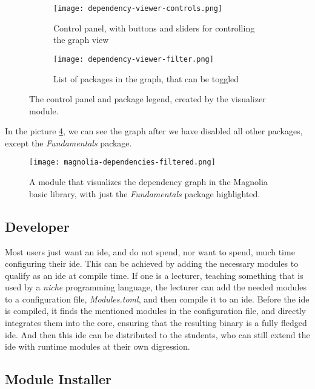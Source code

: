 \begin{figure}[H]
  \begin{subfigure}[h]{0.45\textwidth}
    \centering
    \texttt{[image: dependency-viewer-controls.png]}
    \caption{
      Control panel, with buttons and sliders for controlling the graph view
    }
  \label{pic:depCont}
  \end{subfigure}
  \hfill
  \begin{subfigure}[h]{0.45\textwidth}
    \centering
    \texttt{[image: dependency-viewer-filter.png]}
    \caption{List of packages in the graph, that can be toggled}
    \label{pic:depFil}
  \end{subfigure}
  \caption{
    The control panel and package legend, created by the visualizer module.
  }
  \label{fig:foobarbar}
\end{figure}

In the picture \ref{pic:depDis}, we can see the graph after we have disabled all
other packages, except the \textit{Fundamentals} package.

\begin{figure}[H]
  \centering
  \texttt{[image: magnolia-dependencies-filtered.png]}
  \caption{
    A module that visualizes the dependency graph in the Magnolia basic library,
    with just the \textit{Fundamentals} package highlighted.
  }
  \label{pic:depDis}
\end{figure}


\subsection{Developer}

Most users just want an \gls*{ide}, and do not spend, nor want to spend, much
time configuring their \gls*{ide}. This can be achieved by adding the necessary
modules to qualify as an \gls*{ide} at compile time. If one is a lecturer,
teaching something that is used by a \textit{niche} programming language, the
lecturer can add the needed modules to a configuration file,
\textit{Modules.toml}, and then compile it to an \gls*{ide}. Before the \gls*{ide}
is compiled, it finds the mentioned modules in the configuration file, and
directly integrates them into the core, ensuring that the resulting binary is a
fully fledged \gls*{ide}. And then this \gls*{ide} can be distributed to the
students, who can still extend the \gls*{ide} with runtime modules at their own
digression.

\subsection{Module Installer}

